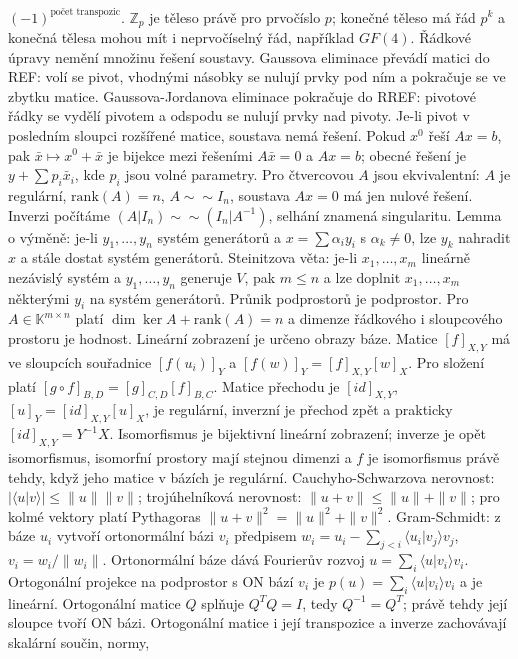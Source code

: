 \begin{odpoved}
$(-1)^{\text{počet transpozic}}$. $\mathbb Z_p$ je těleso právě pro prvočíslo $p$;
konečné těleso má řád $p^k$ a konečná tělesa mohou mít i neprvočíselný řád, například
$GF(4)$. Řádkové úpravy nemění množinu řešení soustavy. Gaussova eliminace převádí
matici do REF: volí se pivot, vhodnými násobky se nulují prvky pod ním a pokračuje se
ve zbytku matice. Gaussova-Jordanova eliminace pokračuje do RREF: pivotové řádky se
vydělí pivotem a odspodu se nulují prvky nad pivoty. Je-li pivot v posledním sloupci
rozšířené matice, soustava nemá řešení. Pokud $x^0$ řeší $Ax=b$, pak
$\bar x\mapsto x^0+\bar x$ je bijekce mezi řešeními $A\bar x=0$ a $Ax=b$; obecné řešení
je $y+\sum p_i\bar x_i$, kde $p_i$ jsou volné parametry. Pro čtvercovou $A$ jsou
ekvivalentní: $A$ je regulární, $\mathrm{rank}(A)=n$, $A\sim\sim I_n$, soustava
$Ax=0$ má jen nulové řešení. Inverzi počítáme
$(A|I_n)\sim\sim(I_n|A^{-1})$, selhání znamená singularitu. Lemma o výměně: je-li
$y_1,\ldots,y_n$ systém generátorů a $x=\sum\alpha_i y_i$ s $\alpha_k\ne0$, lze $y_k$
nahradit $x$ a stále dostat systém generátorů. Steinitzova věta: je-li
$x_1,\ldots,x_m$ lineárně nezávislý systém a $y_1,\ldots,y_n$ generuje $V$, pak
$m\le n$ a lze doplnit $x_1,\ldots,x_m$ některými $y_i$ na systém generátorů. Průnik
podprostorů je podprostor. Pro $A\in\mathbb K^{m\times n}$ platí
$\dim\ker A+\mathrm{rank}(A)=n$ a dimenze řádkového i sloupcového prostoru je hodnost.
Lineární zobrazení je určeno obrazy báze. Matice $[f]_{X,Y}$ má ve sloupcích souřadnice
$[f(u_i)]_Y$ a $[f(w)]_Y=[f]_{X,Y}[w]_X$. Pro složení platí
$[g\circ f]_{B,D}=[g]_{C,D}[f]_{B,C}$. Matice přechodu je $[id]_{X,Y}$,
$[u]_Y=[id]_{X,Y}[u]_X$, je regulární, inverzní je přechod zpět a prakticky
$[id]_{X,Y}=Y^{-1}X$. Isomorfismus je bijektivní lineární zobrazení; inverze je opět
isomorfismus, isomorfní prostory mají stejnou dimenzi a $f$ je isomorfismus právě tehdy,
když jeho matice v bázích je regulární. Cauchyho-Schwarzova nerovnost:
$|\langle u|v\rangle|\le\|u\|\|v\|$; trojúhelníková nerovnost:
$\|u+v\|\le\|u\|+\|v\|$; pro kolmé vektory platí Pythagoras
$\|u+v\|^2=\|u\|^2+\|v\|^2$. Gram-Schmidt: z báze $u_i$ vytvoří ortonormální bázi
$v_i$ předpisem $w_i=u_i-\sum_{j<i}\langle u_i|v_j\rangle v_j$,
$v_i=w_i/\|w_i\|$. Ortonormální báze dává Fourierův rozvoj
$u=\sum_i\langle u|v_i\rangle v_i$. Ortogonální projekce na podprostor s ON bází
$v_i$ je $p(u)=\sum_i\langle u|v_i\rangle v_i$ a je lineární. Ortogonální matice
$Q$ splňuje $Q^TQ=I$, tedy $Q^{-1}=Q^T$; právě tehdy její sloupce tvoří ON bázi.
Ortogonální matice i její transpozice a inverze zachovávají skalární součin, normy,

\end{odpoved}
